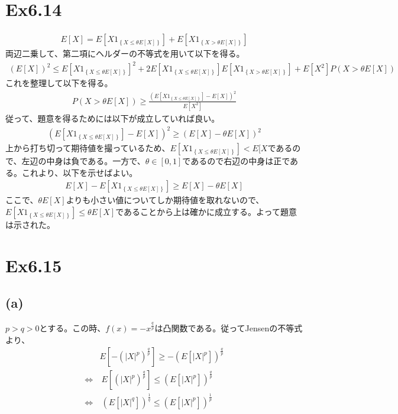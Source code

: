 \documentclass{article}
\begin{document}
\section{Ex6.14}
\begin{align*}
	E[X] = E\left[ X 1_{\left\{ X \leq \theta E[X] \right\}} \right] + E\left[ X 1_{\left\{ X > \theta E[X] \right\}} \right]
\end{align*}
両辺二乗して、第二項にヘルダーの不等式を用いて以下を得る。
\begin{align*}
	\left( E[X] \right)^2 \leq E\left[ X 1_{\left\{ X \leq \theta E[X] \right\}} \right]^2 + 2 E\left[ X 1_{\left\{ X \leq \theta E[X] \right\}} \right] E\left[ X 1_{\left\{ X > \theta E[X] \right\}} \right] + E[X^2] P\left( X > \theta E[X] \right)
\end{align*}
これを整理して以下を得る。
\begin{align*}
	P\left( X > \theta E[X] \right) \geq \frac{\left( E\left[ X 1_{\left\{ X \leq \theta E[X] \right\}} \right] - E[X] \right)^2}{E[X^2]}
\end{align*}
従って、題意を得るためには以下が成立していれば良い。
\begin{align*}
	\left( E\left[ X 1_{\left\{ X \leq \theta E[X] \right\}} \right] - E[X] \right)^2 \geq \left( E[X] - \theta E[X] \right)^2
\end{align*}
上から打ち切って期待値を撮っているため、$E\left[ X 1_{\left\{ X \leq \theta E[X] \right\}} \right] < E[X$であるので、左辺の中身は負である。一方で、$\theta \in [0,1]$であるので右辺の中身は正である。これより、以下を示せばよい。
\begin{align*}
	E[X] - E\left[ X 1_{\left\{ X \leq \theta E[X] \right\}} \right]  \geq E[X] - \theta E[X] 
\end{align*}
ここで、$\theta E[X]$よりも小さい値についてしか期待値を取れないので、$E\left[ X 1_{\left\{ X \leq \theta E[X] \right\}} \right] \leq \theta E[X]$であることから上は確かに成立する。よって題意は示された。

\section{Ex6.15}
\subsection{(a)}
$p > q > 0$とする。この時、$f(x) = -x^{\frac{q}{p}}$は凸関数である。従ってJensenの不等式より、
\begin{align*}
	&E\left[ -\left( |X|^p \right)^{\frac{q}{p}} \right] \geq - \left( E\left[ |X|^p \right]\right)^{\frac{q}{p}}\\[8pt]
	\Leftrightarrow&\ E[\left( |X|^p \right)^{\frac{q}{p}}] \leq \left( E[|X|^p] \right)^{\frac{q}{p}}\\[8pt]
	\Leftrightarrow&\ \left( E[|X|^q]\right)^{\frac{1}{q}} \leq \left( E[|X|^p]\right)^{\frac{1}{p}}
\end{align*}
\end{document}

